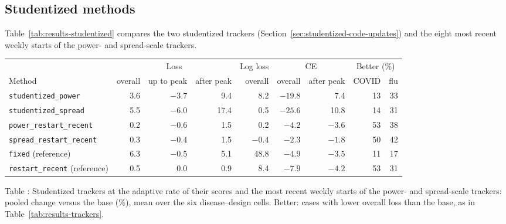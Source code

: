 \documentclass[11pt,a4paper]{article}
\theoremstyle{definition}
\theoremstyle{remark}
\begin{document}
\subsection{Studentized methods}
\label{sec:results-studentized}
\label{sec:results-scaled}
Table~\ref{tab:results-studentized} compares the two studentized trackers
(Section~\ref{sec:studentized-code-updates}) and the eight most recent
weekly starts of the power- and spread-scale trackers.

\begin{center}\small
\setlength{\tabcolsep}{3.5pt}
\renewcommand{\arraystretch}{1.12}
\begin{tabular}{@{}lrrrrrrrr@{}}
\toprule
 & \multicolumn{3}{c}{Loss} & Log loss & \multicolumn{2}{c}{CE} & \multicolumn{2}{c}{Better (\%)}\\
\cmidrule(lr){2-4}\cmidrule(lr){6-7}\cmidrule(l){8-9}
Method & overall & up to peak & after peak & overall & overall & after peak & COVID & flu\\
\midrule
\texttt{studentized\_power}      & 3.6  & $-3.7$ & 9.4  & 8.2    & $-19.8$ & 7.4    & 13 & 33\\
\texttt{studentized\_spread}     & 5.5  & $-6.0$ & 17.4 & 0.5    & $-25.6$ & 10.8   & 14 & 31\\
\texttt{power\_restart\_recent}  & 0.2  & $-0.6$ & 1.5  & 0.2    & $-4.2$  & $-3.6$ & 53 & 38\\
\texttt{spread\_restart\_recent} & 0.3  & $-0.4$ & 1.5  & $-0.4$ & $-2.3$  & $-1.8$ & 50 & 42\\
\addlinespace
\texttt{fixed} (reference)          & 6.3 & $-0.5$ & 5.1 & 48.8 & $-4.9$ & $-3.5$ & 11 & 17\\
\texttt{restart\_recent} (reference) & 0.5 & 0.0   & 0.9 & 8.4  & $-7.9$ & $-4.2$ & 53 & 31\\
\bottomrule
\end{tabular}
\end{center}
\label{tab:results-studentized}
\begin{center}\small Table \thetable: Studentized trackers at the adaptive
rate of their scores and the most recent weekly starts of the power- and
spread-scale trackers: pooled change versus the base (\%), mean over the six
disease--design cells. Better: cases with lower overall loss than the base,
as in Table~\ref{tab:results-trackers}.
\end{center}
\end{document}
